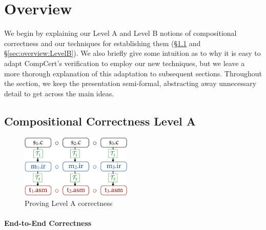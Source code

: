 \section{Overview}
\label{sec:sepcomp:overview}

We begin by explaining our Level A and Level B notions of compositional correctness and our
techniques for establishing them (\S\ref{sec:overview:LevelA} and \S\ref{sec:overview:LevelB}).  We
also briefly give some intuition as to why it is easy to adapt CompCert's verification to employ our
new techniques, but we leave a more thorough explanation of this adaptation to subsequent sections.
Throughout the section, we keep the presentation semi-formal, abstracting away unnecessary detail to
get across the main ideas.

\subsection{Compositional Correctness Level A}
\label{sec:overview:LevelA}

\begin{figure}[!t]
\begin{center}
\includegraphics[width=200px]{sepcomp-levela.png}
\end{center}
\caption{Proving Level A correctness}
\label{fig:LevelA}
\end{figure}


\paragraph{End-to-End Correctness}


